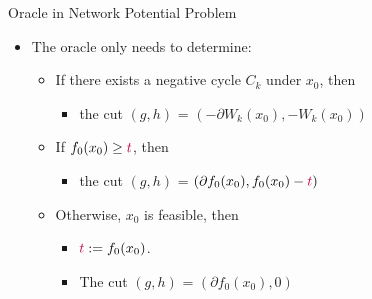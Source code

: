\documentclass[10pt,ignorenonframetext,serif,onlymath]{beamer}
\providecommand{\tightlist}{%
  \setlength{\itemsep}{0pt}\setlength{\parskip}{0pt}}
\begin{document}
\begin{frame}{Oracle in Network Potential Problem}
\protect\hypertarget{oracle-in-network-potential-problem}{}

\begin{itemize}
\tightlist
\item
  The oracle only needs to determine:

  \begin{itemize}
  \tightlist
  \item
    If there exists a negative cycle \(C_k\) under \(x_0\), then

    \begin{itemize}
    \tightlist
    \item
      the cut \((g, h)\) = \((-\partial W_k(x_0), -W_k(x_0))\)
    \end{itemize}
  \item
    If \(f_0(x_0) \geq {\color{purple}t}\), then

    \begin{itemize}
    \tightlist
    \item
      the cut \((g, h)\) =
      \((\partial f_0(x_0), f_0(x_0) - {\color{purple}t})\)
    \end{itemize}
  \item
    Otherwise, \(x_0\) is feasible, then

    \begin{itemize}
    \tightlist
    \item
      \({\color{purple}t} := f_0(x_0)\).
    \item
      The cut \((g, h)\) = \((\partial f_0(x_0), 0)\)
    \end{itemize}
  \end{itemize}
\end{itemize}

\end{frame}
\end{document}
